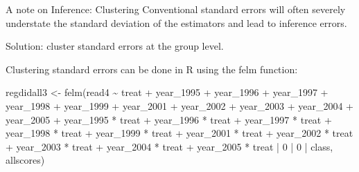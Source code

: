 \documentclass[
  ignorenonframetext,
]{beamer}
\newenvironment{Shaded}{\begin{snugshade}}{\end{snugshade}}
\newcommand{\DecValTok}[1]{\textcolor[rgb]{0.00,0.00,0.81}{#1}}
\newcommand{\FunctionTok}[1]{\textcolor[rgb]{0.00,0.00,0.00}{#1}}
\newcommand{\NormalTok}[1]{#1}
\newcommand{\OtherTok}[1]{\textcolor[rgb]{0.56,0.35,0.01}{#1}}
\newcommand{\SpecialCharTok}[1]{\textcolor[rgb]{0.00,0.00,0.00}{#1}}
\begin{document}
\begin{frame}[fragile]{A note on Inference: Clustering}
\protect\hypertarget{a-note-on-inference-clustering-1}{}
Conventional standard errors will often severely understate the standard
deviation of the estimators and lead to inference errors.

Solution: cluster standard errors at the group level.

Clustering standard errors can be done in R using the felm function:
\tiny

\begin{Shaded}
\begin{Highlighting}[]
\NormalTok{regdidall3 }\OtherTok{\textless{}{-}} \FunctionTok{felm}\NormalTok{(read4 }\SpecialCharTok{\textasciitilde{}}\NormalTok{ treat }\SpecialCharTok{+}\NormalTok{ year\_1995 }\SpecialCharTok{+}\NormalTok{ year\_1996 }\SpecialCharTok{+}\NormalTok{ year\_1997 }\SpecialCharTok{+}
\NormalTok{    year\_1998 }\SpecialCharTok{+}\NormalTok{ year\_1999 }\SpecialCharTok{+}\NormalTok{ year\_2001 }\SpecialCharTok{+}\NormalTok{ year\_2002 }\SpecialCharTok{+}\NormalTok{ year\_2003 }\SpecialCharTok{+}
\NormalTok{    year\_2004 }\SpecialCharTok{+}\NormalTok{ year\_2005 }\SpecialCharTok{+}\NormalTok{ year\_1995 }\SpecialCharTok{*}\NormalTok{ treat }\SpecialCharTok{+}\NormalTok{ year\_1996 }\SpecialCharTok{*}\NormalTok{ treat }\SpecialCharTok{+}
\NormalTok{    year\_1997 }\SpecialCharTok{*}\NormalTok{ treat }\SpecialCharTok{+}\NormalTok{ year\_1998 }\SpecialCharTok{*}\NormalTok{ treat }\SpecialCharTok{+}\NormalTok{ year\_1999 }\SpecialCharTok{*}\NormalTok{ treat }\SpecialCharTok{+}
\NormalTok{    year\_2001 }\SpecialCharTok{*}\NormalTok{ treat }\SpecialCharTok{+}\NormalTok{ year\_2002 }\SpecialCharTok{*}\NormalTok{ treat }\SpecialCharTok{+}\NormalTok{ year\_2003 }\SpecialCharTok{*}\NormalTok{ treat }\SpecialCharTok{+}
\NormalTok{    year\_2004 }\SpecialCharTok{*}\NormalTok{ treat }\SpecialCharTok{+}\NormalTok{ year\_2005 }\SpecialCharTok{*}\NormalTok{ treat }\SpecialCharTok{|} \DecValTok{0} \SpecialCharTok{|} \DecValTok{0} \SpecialCharTok{|}\NormalTok{ class, allscores)}
\end{Highlighting}
\end{Shaded}
\end{frame}
\end{document}
